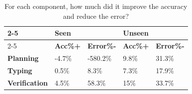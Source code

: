 \begin{table}[h]
\resizebox{\linewidth}{!}
{\begin{tabular}{l|l|l|l|l|}
\cline{2-5}
                                            & \multicolumn{2}{l|}{\textbf{Seen}}  & \multicolumn{2}{l|}{\textbf{Unseen}} \\ \cline{2-5} 
                                            & \textbf{Acc\%+} & \textbf{Error\%-} & \textbf{Acc\%+}  & \textbf{Error\%-} \\ \hline
\multicolumn{1}{|l|}{\textbf{Planning}}     & -4.7\%          & -580.2\%          & 9.8\%            & 31.3\%            \\ \hline
\multicolumn{1}{|l|}{\textbf{Typing}}       & 0.5\%           & 8.3\%             & 7.3\%            & 17.9\%            \\ \hline
\multicolumn{1}{|l|}{\textbf{Verification}} & 4.5\%           & 58.3\%            & 15\%             & 33.7\%            \\ \hline
\end{tabular}
}

\caption{For each component, how much did it improve the accuracy and reduce the error?}
\label{table:coverage-error}
\end{table}